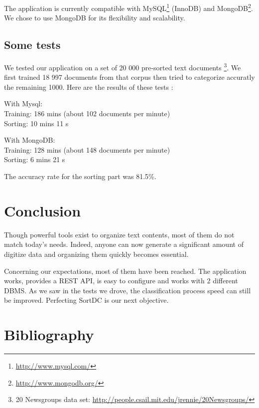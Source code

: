 \documentclass[a4paper,11pt]{article}
\begin{document}
The application is currently compatible with MySQL\footnote{\url{http://www.mysql.com/}}
(InnoDB) and MongoDB\footnote{\url{http://www.mongodb.org/}}. We chose to use
MongoDB for its flexibility and scalability.

\subsection{Some tests}
    
We tested our application on a set of 20 000 pre-sorted text documents
\footnote{20 Newsgroups data set: \url{http://people.csail.mit.edu/jrennie/20Newsgroups/}}.
We first trained 18 997 documents from that corpus then tried to categorize
accuratly the remaining 1000. Here are the results of these tests :

With Mysql:\\
Training: 186 mins (about 102 documents per minute)\\
Sorting: 10 mins 11 s

With MongoDB:\\
Training: 128 mins (about 148 documents per minute)\\
Sorting: 6 mins 21 s

The accuracy rate for the sorting part was 81.5\%.


\section*{Conclusion}

Though powerful tools exist to organize text contents, most of them do not
match today's needs. Indeed, anyone can now generate a significant amount
of digitize data and organizing them quickly becomes essential.

Concerning our expectations, most of them have been reached. The application
works, provides a REST API, is easy to configure and works with 2 different
DBMS. As we saw in the tests we drove, the classification process speed can
still be improved. Perfecting SortDC is our next objective.




\clearpage
\section*{Bibliography}
\end{document}
